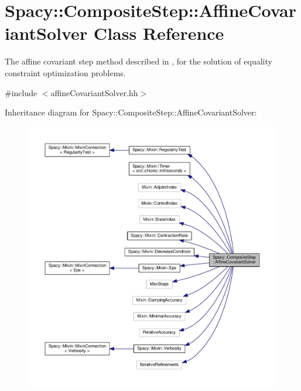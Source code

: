 \hypertarget{classSpacy_1_1CompositeStep_1_1AffineCovariantSolver}{}\section{Spacy\+:\+:Composite\+Step\+:\+:Affine\+Covariant\+Solver Class Reference}
\label{classSpacy_1_1CompositeStep_1_1AffineCovariantSolver}


The affine covariant step method described in \cite{Lubkoll2015}, \cite{Lubkoll2015a} for the solution of equality constraint optimization problems.  




{\ttfamily \#include $<$affine\+Covariant\+Solver.\+hh$>$}



Inheritance diagram for Spacy\+:\+:Composite\+Step\+:\+:Affine\+Covariant\+Solver\+:
\nopagebreak
\begin{figure}[H]
\begin{center}
\leavevmode
\includegraphics[width=350pt]{classSpacy_1_1CompositeStep_1_1AffineCovariantSolver__inherit__graph}
\end{center}
\end{figure}


